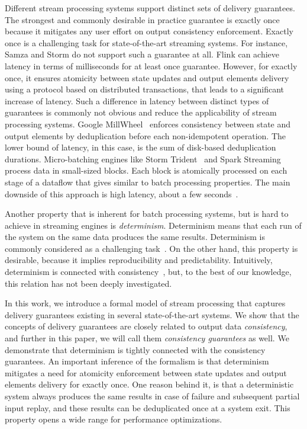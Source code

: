 Different stream processing systems support distinct sets of delivery guarantees. The strongest and commonly desirable in practice guarantee is exactly once because it mitigates any user effort on output consistency enforcement. Exactly once is a challenging task for state-of-the-art streaming systems. For instance, Samza and Storm do not support such a guarantee at all. Flink can achieve latency in terms of milliseconds for at least once guarantee. However, for exactly once, it ensures atomicity between state updates and output elements delivery using a protocol based on distributed transactions, that leads to a significant increase of latency. Such a difference in latency between distinct types of guarantees is commonly not obvious and reduce the applicability of stream processing systems. Google MillWheel~\cite{Akidau:2013:MFS:2536222.2536229} enforces consistency between state and output elements by deduplication before each non-idempotent operation. The lower bound of latency, in this case, is the sum of disk-based deduplication durations. Micro-batching engines like Storm Trident~\cite{apache:storm:trident} and Spark Streaming~\cite{Zaharia:2012:DSE:2342763.2342773} process data in small-sized blocks. Each block is atomically processed on each stage of a dataflow that gives similar to batch processing properties. The main downside of this approach is high latency, about a few seconds~\cite{7530084, 7474816}.

Another property that is inherent for batch processing systems, but is hard to achieve in streaming engines is {\em determinism}. Determinism means that each run of the system on the same data produces the same results. Determinism is commonly considered as a challenging task~\cite{Zacheilas:2017:MDS:3093742.3093921}. On the other hand, this property is desirable, because it implies reproducibility and predictability. Intuitively, determinism is connected with consistency~\cite{Stonebraker:2005:RRS:1107499.1107504}, but, to the best of our knowledge, this relation has not been deeply investigated. 

In this work, we introduce a formal model of stream processing that captures delivery guarantees existing in several state-of-the-art systems. We show that the concepts of delivery guarantees are closely related to output data {\em consistency}, and further in this paper, we will call them {\em consistency guarantees} as well. We demonstrate that determinism is tightly connected with the consistency guarantees. An important inference of the formalism is that determinism mitigates a need for atomicity enforcement between state updates and output elements delivery for exactly once. One reason behind it, is that a deterministic system always produces the same results in case of failure and subsequent partial input replay, and these results can be deduplicated once at a system exit. This property opens a wide range for performance optimizations.

